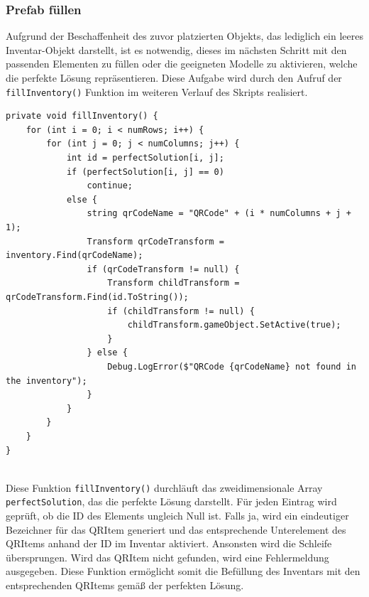 \subsubsection{Prefab füllen}
Aufgrund der Beschaffenheit des zuvor platzierten Objekts, das lediglich ein leeres Inventar-Objekt darstellt, ist es
notwendig, dieses im nächsten Schritt mit den passenden Elementen zu füllen oder die geeigneten Modelle zu aktivieren,
welche die perfekte Lösung repräsentieren. Diese Aufgabe wird durch den Aufruf der \texttt{fillInventory()} Funktion im
weiteren Verlauf des Skripts realisiert.
\begin{lstlisting}[style=csharp, caption={Inventar füllen}, label=code:invFül_PSV]
private void fillInventory() {
    for (int i = 0; i < numRows; i++) {
        for (int j = 0; j < numColumns; j++) {
            int id = perfectSolution[i, j];
            if (perfectSolution[i, j] == 0)
                continue;
            else {
                string qrCodeName = "QRCode" + (i * numColumns + j + 1);
                Transform qrCodeTransform = inventory.Find(qrCodeName);
                if (qrCodeTransform != null) {
                    Transform childTransform = qrCodeTransform.Find(id.ToString());
                    if (childTransform != null) {
                        childTransform.gameObject.SetActive(true);
                    }
                } else {
                    Debug.LogError($"QRCode {qrCodeName} not found in the inventory");
                }
            }
        }
    }
}
\end{lstlisting}\\
Diese Funktion \texttt{fillInventory()} durchläuft das zweidimensionale Array \texttt{perfectSolution}, das die perfekte
Lösung darstellt. Für jeden Eintrag wird geprüft, ob die ID des Elements ungleich Null ist. Falls ja, wird ein eindeutiger
Bezeichner für das QRItem generiert und das entsprechende Unterelement des QRItems anhand der ID im Inventar aktiviert.
Ansonsten wird die Schleife übersprungen. Wird das QRItem nicht gefunden, wird eine Fehlermeldung ausgegeben. Diese Funktion
ermöglicht somit die Befüllung des Inventars mit den entsprechenden QRItems gemäß der perfekten Lösung.

